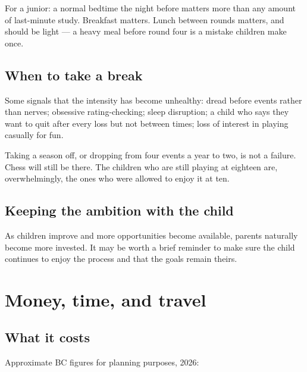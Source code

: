 \documentclass[10pt,letterpaper]{article}
\begin{document}
For a junior: a normal bedtime the night before matters more than any amount of
last-minute study. Breakfast matters. Lunch between rounds matters, and should
be light --- a heavy meal before round four is a mistake children make once.

\subsection{When to take a break}

Some signals that the intensity has become unhealthy: dread before events rather
than nerves; obsessive rating-checking; sleep disruption; a child who says they
want to quit after every loss but not between times; loss of interest in playing
casually for fun.

Taking a season off, or dropping from four events a year to two, is not a
failure. Chess will still be there. The children who are still playing at
eighteen are, overwhelmingly, the ones who were allowed to enjoy it at ten.

\subsection{Keeping the ambition with the child} 
As children improve and more opportunities become available, parents naturally become more invested. It may be worth a brief reminder to make sure the child continues to enjoy the process and that the goals remain theirs.

\section{Money, time, and travel}

\subsection{What it costs}

Approximate BC figures for planning purposes, 2026:
\end{document}
